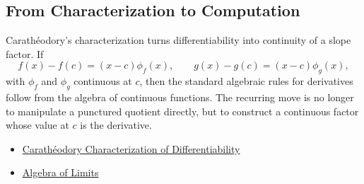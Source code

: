 \subsection{From Characterization to Computation}

\begin{remark*}[Interpretation]
Carath\'{e}odory's characterization turns differentiability into continuity of a slope factor. If
\[
  f(x)-f(c)=(x-c)\phi_f(x),
  \qquad
  g(x)-g(c)=(x-c)\phi_g(x),
\]
with $\phi_f$ and $\phi_g$ continuous at $c$, then the standard algebraic rules for derivatives follow from the algebra of continuous functions. The recurring move is no longer to manipulate a punctured quotient directly, but to construct a continuous factor whose value at $c$ is the derivative.
\end{remark*}

\begin{dependencies}
\begin{itemize}
  \item \hyperref[thm:caratheodory-characterization-of-differentiability]{Carath\'{e}odory Characterization of Differentiability}
  \item \hyperref[thm:limit-product]{Algebra of Limits}
\end{itemize}
\end{dependencies}
